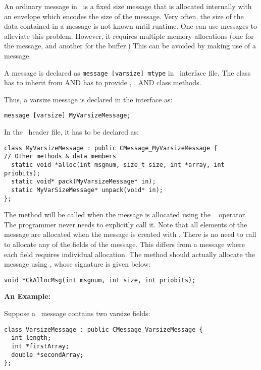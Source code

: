 An ordinary message in \charmpp\ is a fixed size message that is
allocated internally with an envelope which encodes the size of the
message. Very often, the size of the data contained in a message is
not known until runtime. One can use  messages to alleviate 
this problem. However, it requires multiple memory allocations (one
for the message, and another for the buffer.) This can be avoided by
making use of a  message.

A  message is declared as {\tt message [varsize] mtype} in
\charmpp\ interface file. The class  has to inherit from
 AND has to provide ,
, AND
 class methods.

Thus, a varsize message is declared in the interface as: 

\verb+message [varsize] MyVarsizeMessage;+ 

In the \CC\ header file, it has to be declared as: 

\begin{verbatim}
class MyVarsizeMessage : public CMessage_MyVarsizeMessage { 
// Other methods & data members 
  static void *alloc(int msgnum, size_t size, int *array, int priobits); 
  static void* pack(MyVarsizeMessage* in); 
  static MyVarSizeMessage* unpack(void* in); 
}; 
\end{verbatim}

The  method will be called when the message is allocated using
the \CC\  operator. The programmer never needs to explicitly
call it.  Note that all elements of the message are allocated when the message is created with .  There is no need to call  to allocate any of the fields of the message.  This differs from a  message where each field requires individual allocation.     
The  method should actually allocate the message using
, whose signature is given below:

\begin{verbatim}
void *CkAllocMsg(int msgnum, int size, int priobits); 
\end{verbatim}  

{\bf An Example:}

Suppose a \charmpp\ message contains two varsize fields:

\begin{verbatim} 
class VarsizeMessage : public CMessage_VarsizeMessage { 
  int length; 
  int *firstArray; 
  double *secondArray; 
}; 
\end{verbatim}

